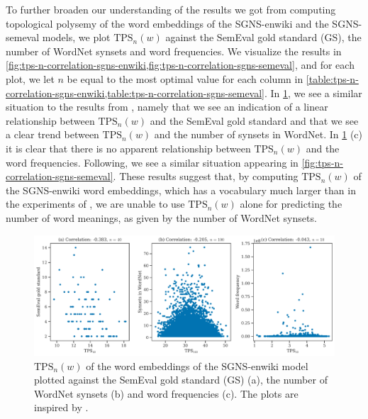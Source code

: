 To further broaden our understanding of the results we got from computing topological polysemy of the word embeddings of the SGNS-enwiki and the SGNS-semeval models, we plot $\text{TPS}_n(w)$ against the SemEval gold standard (GS), the number of WordNet synsets and word frequencies. We visualize the results in \cref{fig:tps-n-correlation-sgns-enwiki,fig:tps-n-correlation-sgns-semeval}, and for each plot, we let $n$ be equal to the most optimal value for each column in \cref{table:tps-n-correlation-sgns-enwiki,table:tps-n-correlation-sgns-semeval}. In \cref{fig:tps-n-correlation-sgns-enwiki}, we see a similar situation to the results from \cite[Figures 8 and 9]{jakubowski2020topology}, namely that we see an indication of a linear relationship between $\text{TPS}_n(w)$ and the SemEval gold standard and that we see a clear trend between $\text{TPS}_n(w)$ and the number of synsets in WordNet. In \cref{fig:tps-n-correlation-sgns-enwiki} (c) it is clear that there is no apparent relationship between $\text{TPS}_n(w)$ and the word frequencies. Following, we see a similar situation appearing in \cref{fig:tps-n-correlation-sgns-semeval}. These results suggest that, by computing $\text{TPS}_n(w)$ of the SGNS-enwiki word embeddings, which has a vocabulary much larger than in the experiments of \cite{jakubowski2020topology}, we are unable to use $\text{TPS}_n(w)$ alone for predicting the number of word meanings, as given by the number of WordNet synsets.
\begin{figure}[H]
    \centering
    \includegraphics[width=\textwidth]{thesis/figures/tps-n-correlation-sgns-enwiki.pdf}
    \caption{$\text{TPS}_n(w)$ of the word embeddings of the SGNS-enwiki model plotted against the SemEval gold standard (GS) (a), the number of WordNet synsets (b) and word frequencies (c). The plots are inspired by \cite[Figures 8 and 9]{jakubowski2020topology}.}
    \label{fig:tps-n-correlation-sgns-enwiki}
\end{figure}
